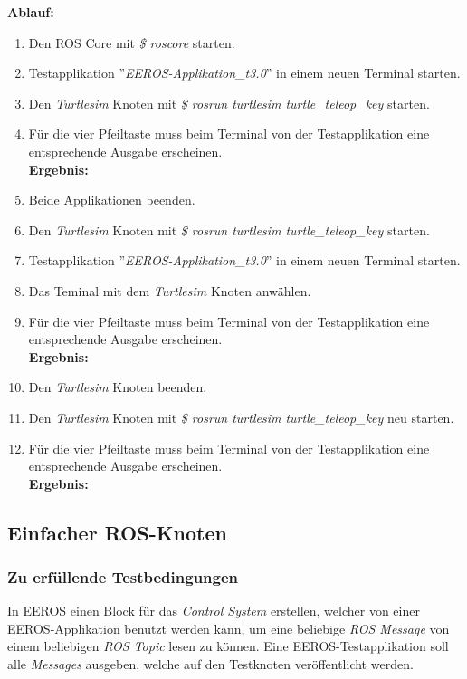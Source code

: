 \textbf{Ablauf: } 
\begin{enumerate}
\item Den ROS Core mit \textit{\$ roscore} starten.
\item Testapplikation ''\textit{EEROS-Applikation\_t3.0}'' in einem neuen Terminal starten.
\item Den \textit{Turtlesim} Knoten mit \textit{\$ rosrun turtlesim turtle\_teleop\_key} starten.
\item Für die vier Pfeiltaste muss beim Terminal von der Testapplikation eine entsprechende Ausgabe erscheinen. \\
\textbf{Ergebnis:} \checkmark
\item Beide Applikationen beenden.
\item Den \textit{Turtlesim} Knoten mit \textit{\$ rosrun turtlesim turtle\_teleop\_key} starten.
\item Testapplikation ''\textit{EEROS-Applikation\_t3.0}'' in einem neuen Terminal starten.
\item Das Teminal mit dem \textit{Turtlesim} Knoten anwählen.
\item Für die vier Pfeiltaste muss beim Terminal von der Testapplikation eine entsprechende Ausgabe erscheinen. \\
\textbf{Ergebnis:} \checkmark
\item Den \textit{Turtlesim} Knoten beenden.
\item Den \textit{Turtlesim} Knoten mit \textit{\$ rosrun turtlesim turtle\_teleop\_key} neu starten.
\item Für die vier Pfeiltaste muss beim Terminal von der Testapplikation eine entsprechende Ausgabe erscheinen. \\
\textbf{Ergebnis:} \checkmark
\end{enumerate}


\subsection{Einfacher ROS-Knoten}
\subsubsection{Zu erfüllende Testbedingungen}
In EEROS einen Block für das \textit{Control System} erstellen, welcher von einer EEROS-Applikation benutzt werden kann, um eine beliebige \textit{ROS Message} von einem beliebigen \textit{ROS Topic} lesen zu können.
Eine EEROS-Testapplikation soll alle \textit{Messages} ausgeben, welche auf den Testknoten veröffentlicht werden.

